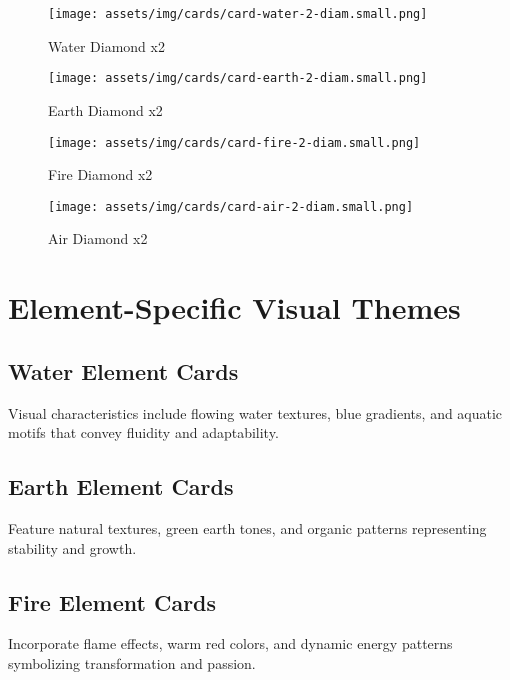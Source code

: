 \documentclass[12pt,a4paper]{article}
\begin{document}
\begin{figure}[h]
\centering
\begin{minipage}{0.2\textwidth}
    \centering
    \texttt{[image: assets/img/cards/card-water-2-diam.small.png]}
    \caption*{\textcolor{waterblue}{Water Diamond x2}}
\end{minipage}
\hfill
\begin{minipage}{0.2\textwidth}
    \centering
    \texttt{[image: assets/img/cards/card-earth-2-diam.small.png]}
    \caption*{\textcolor{earthgreen}{Earth Diamond x2}}
\end{minipage}
\hfill
\begin{minipage}{0.2\textwidth}
    \centering
    \texttt{[image: assets/img/cards/card-fire-2-diam.small.png]}
    \caption*{\textcolor{firered}{Fire Diamond x2}}
\end{minipage}
\hfill
\begin{minipage}{0.2\textwidth}
    \centering
    \texttt{[image: assets/img/cards/card-air-2-diam.small.png]}
    \caption*{\textcolor{airyellow}{Air Diamond x2}}
\end{minipage}
\end{figure}

\section{Element-Specific Visual Themes}

\subsection{\textcolor{waterblue}{Water Element Cards}}
Visual characteristics include flowing water textures, blue gradients, and aquatic motifs that convey fluidity and adaptability.

\subsection{\textcolor{earthgreen}{Earth Element Cards}}
Feature natural textures, green earth tones, and organic patterns representing stability and growth.

\subsection{\textcolor{firered}{Fire Element Cards}}
Incorporate flame effects, warm red colors, and dynamic energy patterns symbolizing transformation and passion.
\end{document}
